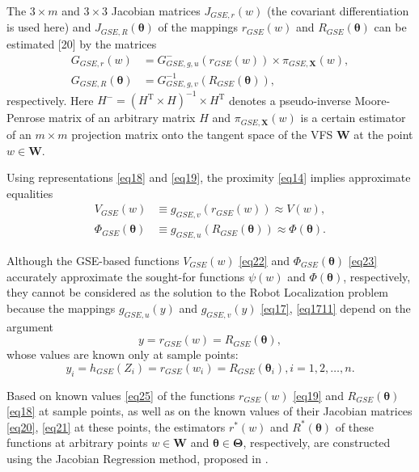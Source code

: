 \documentclass[conference]{IEEEtran} %
\def\mbW{\mathbf{W}}
\def\mbTheta{{\bm\Theta}}
\def\mbtheta{{\bm\theta}}
\def\mbX{\mathbf{X}}
\begin{document}
The $3\times m$ and $3\times3$ Jacobian matrices $J_{GSE,r}(w)$ (the covariant differentiation is used here) and $J_{GSE,R}(\mbtheta)$ of the mappings $r_{GSE}(w)$ and $R_{GSE}(\mbtheta)$ can be estimated [20] by the matrices
\begin{align}
\label{eq20}
	G_{GSE,r}(w) &= G_{GSE,g,u}^- (r_{GSE}(w)) \times \pi_{GSE,\mbX}(w),	\\
    \label{eq21}
	G_{GSE,R}(\mbtheta) &= G_{GSE,g,v}^{-1} (R_{GSE}(\mbtheta)),
\end{align}    
respectively. Here $H^{-} = (H^{\mathrm{T}}\times H)^{-1}\times H^{\mathrm{T}}$ denotes a pseudo-inverse Moore-Penrose matrix \cite{bib28} of an arbitrary matrix $H$ and $\pi_{GSE,\mbX}(w)$ is a certain estimator \cite{bib20} of an $m\times m$ projection matrix onto the tangent space of the VFS $\mbW$ at the point $w \in \mbW$.

Using representations \eqref{eq18} and \eqref{eq19}, the proximity \eqref{eq14} implies  approximate equalities
\begin{align}
\label{eq22}
	V_{GSE}(w) &\equiv g_{GSE,v}(r_{GSE}(w)) \approx V(w),\\
    \label{eq23}
	\Phi_{GSE}(\mbtheta) &\equiv g_{GSE,u}(R_{GSE}(\mbtheta)) \approx \Phi(\mbtheta). 	
\end{align}    

Although the GSE-based functions $V_{GSE}(w)$ \eqref{eq22} and $\Phi_{GSE}(\mbtheta)$ \eqref{eq23} accurately approximate the sought-for functions $\psi(w)$ and $\Phi(\mbtheta)$, respectively, they cannot be considered as the solution to the Robot Localization problem because the mappings $g_{GSE,u}(y)$ and $g_{GSE,v}(y)$ \eqref{eq17}, \eqref{eq1711} depend on the argument 
\begin{equation}
\label{eq24}
	y = r_{GSE}(w) = R_{GSE}(\mbtheta),
\end{equation}    
whose values are known only at sample points:
\begin{equation}
\label{eq25}
	y_i = h_{GSE}(Z_i) = r_{GSE}(w_i) = R_{GSE}(\mbtheta_i), i = 1, 2, \ldots , n.
\end{equation}    

Based on known values \eqref{eq25} of the functions $r_{GSE}(w)$ \eqref{eq19} and $R_{GSE}(\mbtheta)$ \eqref{eq18} at sample points, as well as on the known values of their Jacobian matrices \eqref{eq20}, \eqref{eq21} at these points, the estimators $r^*(w)$ and $R^*(\mbtheta)$ of these functions at arbitrary points $w \in \mbW$ and $\mbtheta\in\mbTheta$, respectively, are constructed using the Jacobian Regression method, proposed in \cite{bib29}. 
\end{document}
